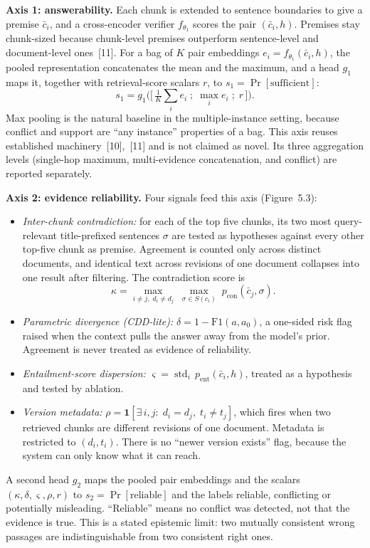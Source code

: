 \documentclass[12pt,a4paper]{article}
\begin{document}
\textbf{Axis 1: answerability.} Each chunk is extended to sentence boundaries to give a premise $\bar c_i$, and a cross-encoder verifier $f_{\theta_1}$ scores the pair $(\bar c_i,h)$. Premises stay chunk-sized because chunk-level premises outperform sentence-level and document-level ones~[11]. For a bag of $K$ pair embeddings $e_i=f_{\theta_1}(\bar c_i,h)$, the pooled representation concatenates the mean and the maximum, and a head $g_1$ maps it, together with retrieval-score scalars $r$, to $s_1=\Pr[\text{sufficient}]$:
\begin{equation}
s_1 = g_1\big(\big[\,\tfrac{1}{K}\textstyle\sum_{i} e_i \;;\; \max_i e_i \;;\; r\,\big]\big).
\end{equation}
Max pooling is the natural baseline in the multiple-instance setting, because conflict and support are ``any instance'' properties of a bag. This axis reuses established machinery~[10],~[11] and is not claimed as novel. Its three aggregation levels (single-hop maximum, multi-evidence concatenation, and conflict) are reported separately.

\textbf{Axis 2: evidence reliability.} Four signals feed this axis (Figure~5.3):
\begin{itemize}
\item \emph{Inter-chunk contradiction:} for each of the top five chunks, its two most query-relevant title-prefixed sentences $\sigma$ are tested as hypotheses against every other top-five chunk as premise. Agreement is counted only across distinct documents, and identical text across revisions of one document collapses into one result after filtering. The contradiction score is
\begin{equation}
\kappa=\max_{i\neq j,\;d_i\neq d_j}\;\max_{\sigma\in S(c_i)}\;p_{\mathrm{con}}(\bar c_j,\sigma).
\end{equation}
\item \emph{Parametric divergence (CDD-lite):} $\delta=1-\mathrm{F1}(a,a_0)$, a one-sided risk flag raised when the context pulls the answer away from the model's prior. Agreement is never treated as evidence of reliability.
\item \emph{Entailment-score dispersion:} $\varsigma=\operatorname{std}_i\,p_{\mathrm{ent}}(\bar c_i,h)$, treated as a hypothesis and tested by ablation.
\item \emph{Version metadata:} $\rho=\mathbf{1}[\exists\, i,j:\; d_i=d_j,\; t_i\neq t_j]$, which fires when two retrieved chunks are different revisions of one document. Metadata is restricted to $(d_i,t_i)$. There is no ``newer version exists'' flag, because the system can only know what it can reach.
\end{itemize}
A second head $g_2$ maps the pooled pair embeddings and the scalars $(\kappa,\delta,\varsigma,\rho,r)$ to $s_2=\Pr[\text{reliable}]$ and the labels reliable, conflicting or potentially misleading. ``Reliable'' means no conflict was detected, not that the evidence is true. This is a stated epistemic limit: two mutually consistent wrong passages are indistinguishable from two consistent right ones.
\end{document}

